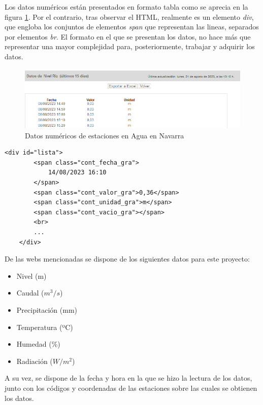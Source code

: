 Los datos numéricos están presentados en formato tabla como se aprecia en la figura \ref{fig:ej26}. Por el contrario, tras observar el HTML, realmente es un elemento \textit{div}, que engloba los conjuntos de elementos \textit{span} que representan las lineas, separados por elementos \textit{br}. El formato en el que se presentan los datos, no hace más que representar una mayor complejidad para, posteriormente, trabajar y adquirir los datos. 

\begin{figure} [H]
	\centering
	\includegraphics[width=.8\linewidth]{fig/AguaEnNavarraData.png}
	\caption{Datos numéricos de estaciones en Agua en Navarra}
	\label{fig:ej26}
\end{figure}

\begin{lstlisting}[basicstyle=\footnotesize, caption={HTML datos en El Agua en Navarra}]
	<div id="lista">	                
		<span class="cont_fecha_gra">
			14/08/2023 16:10
		</span>
		<span class="cont_valor_gra">0,36</span>
		<span class="cont_unidad_gra">m</span>
		<span class="cont_vacio_gra"></span>
		<br>
		...
	</div>
\end{lstlisting}

De las webs mencionadas se dispone de los siguientes datos para este proyecto:

\begin{itemize}
	\setlength\itemsep{0.5em}
	\item Nivel (m)
	\item Caudal ($m^3/s$)
	\item Precipitación (mm)
	\item Temperatura (ºC)
	\item Humedad (\%)
	\item Radiación ($W/m^2$)
\end{itemize}

A su vez, se dispone de la fecha y hora en la que se hizo la lectura de los datos, junto con los códigos y coordenadas de las estaciones sobre las cuales se obtienen los datos.